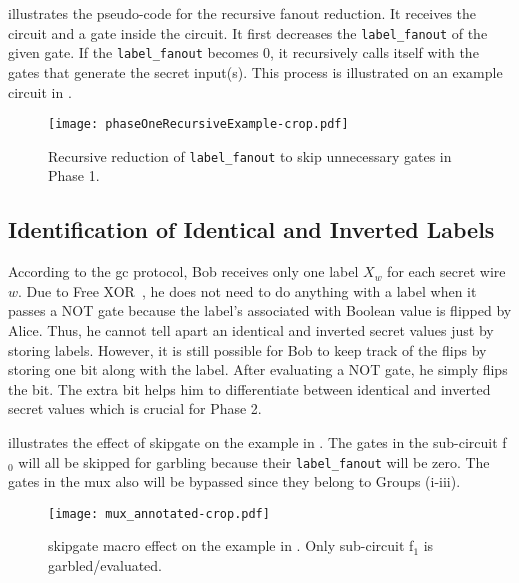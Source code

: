  illustrates the pseudo-code for the recursive fanout reduction.
It receives the circuit and a gate inside the circuit.
It first decreases the \texttt{label\_fanout} of the given gate.
If the \texttt{label\_fanout} becomes 0, it recursively calls itself with the gates that generate the secret input(s).
This process is illustrated on an example circuit in .

\begin{figure}
    \centering
    \texttt{[image: phaseOneRecursiveExample-crop.pdf]}
    \caption{Recursive reduction of \texttt{label\_fanout} to skip unnecessary gates in Phase 1.}
    \label{fig:phaseOneRecursive}
\end{figure}

\subsection{Identification of Identical and Inverted Labels}\label{ssec:skipgate-ident}
According to the \acrshort{gc} protocol, Bob receives only one label $X_w$ for each secret wire $w$.
Due to Free XOR~\cite{kolesnikov2008improved}, he does not need to do anything with a label when it passes a NOT gate because the label's associated with Boolean value is flipped by Alice.
Thus, he cannot tell apart an identical and inverted secret values just by storing labels.
However, it is still possible for Bob to keep track of the flips by storing one bit along with the label.
After evaluating a NOT gate, he simply flips the bit.
The extra bit helps him to differentiate between identical and inverted secret values which is crucial for Phase 2.

 illustrates the effect of \gls{skipgate} on the example in .
The gates in the sub-circuit f$_0$ will all be skipped for garbling because their \texttt{label\_fanout} will be zero.
The gates in the \acrshort{mux} also will be bypassed since they belong to Groups (i-iii).

\begin{figure}
    \centering
    \texttt{[image: mux\_annotated-crop.pdf]}
    \caption{\gls{skipgate} macro effect on the example in .
    		 Only sub-circuit f$_1$ is garbled/evaluated.}
\label{fig:mux_annotated}
\end{figure}

